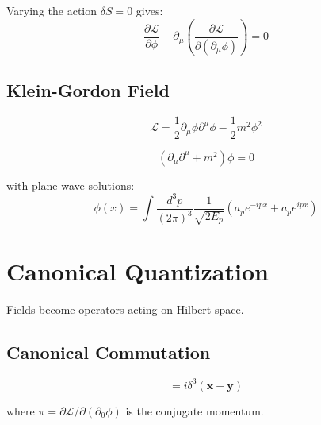 \begin{theorem}
\label{thm:euler-lagrange}
Varying the action $\delta S = 0$ gives:
\begin{equation}
\frac{\partial\mathcal{L}}{\partial\phi} - \partial_\mu\left(\frac{\partial\mathcal{L}}{\partial(\partial_\mu\phi)}\right) = 0
\end{equation}
\end{theorem}

\subsection{Klein-Gordon Field}

\begin{definition}
\label{def:kg}
\begin{equation}
\mathcal{L} = \frac{1}{2}\partial_\mu\phi\partial^\mu\phi - \frac{1}{2}m^2\phi^2
\end{equation}
\end{definition}

\begin{proposition}
\label{prop:kg-eq}
\begin{equation}
(\partial_\mu\partial^\mu + m^2)\phi = 0
\end{equation}

with plane wave solutions:
\begin{equation}
\phi(x) = \int \frac{d^3p}{(2\pi)^3}\frac{1}{\sqrt{2E_p}}(a_p e^{-ipx} + a_p^\dagger e^{ipx})
\end{equation}
\end{proposition}

\section{Canonical Quantization}

Fields become operators acting on Hilbert space.

\subsection{Canonical Commutation}

\begin{definition}
\label{def:field-ops}
\begin{equation}
[\phi(t,\mathbf{x}), \pi(t,\mathbf{y})] = i\delta^3(\mathbf{x}-\mathbf{y})
\end{equation}

where $\pi = \partial\mathcal{L}/\partial(\partial_0\phi)$ is the conjugate momentum.
\end{definition}

